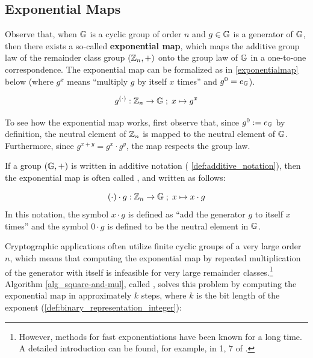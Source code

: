 \subsection{Exponential Maps}
Observe that, when $\mathbb{G}$ is a cyclic group of order $n$ and $g\in \mathbb{G}$ is a generator of $\mathbb{G}$, then there exists a so-called \textbf{exponential map}, which maps the additive group law of the remainder class group $(\mathbb{Z}_n,+)$ onto the group law of $\mathbb{G}$ in a one-to-one correspondence. The exponential map can be formalized as in \eqref{exponentialmap} below (where $g^x$ means ``multiply $g$ by itself $x$ times'' and $g^0=e_{\mathbb{G}}$).

\begin{equation}\label{exponentialmap}
g^{(\cdot)}: \mathbb{Z}_n \to \mathbb{G}\;;\; x \mapsto g^x
\end{equation}

To see how the exponential map works, first observe that, since $g^0:=e_{\mathbb{G}}$ by definition, the neutral element of $\mathbb{Z}_n$ is mapped to the neutral element of $\mathbb{G}$. Furthermore, since $g^{x+y}=g^x\cdot g^y$, the map respects the group law.

\begin{notation}
\label{def:scalar_multiplication} If a group $(\mathbb{G},+)$ is written in additive notation (\notationname{} \ref{def:additive_notation}), then the exponential map is often called , and written as follows:

\begin{equation}\label{scalarmultiplication}
(\cdot)\cdot g: \mathbb{Z}_n \to \mathbb{G}\;;\; x \mapsto x\cdot g
\end{equation}
In this notation, the symbol $x\cdot g$  is defined as ``add the generator $g$ to itself $x$ times'' and the symbol $0\cdot g$ is defined to be the neutral element in $\mathbb{G}$.
\end{notation}

Cryptographic applications often utilize finite cyclic groups of a very large order $n$, which means that computing the exponential map by repeated multiplication of the generator with itself is infeasible for very large remainder classes.\footnote{However, methods for fast exponentiations have been known for a long time. A detailed introduction can be found, for example, in \chaptname{} 1, \secname{} 7 of \cite{mignotte-1992}. }
 Algorithm \ref{alg_square-and-mul}, called , solves this problem by computing the exponential map in approximately $k$ steps, where $k$ is the bit length of the exponent (\ref{def:binary_representation_integer}):

